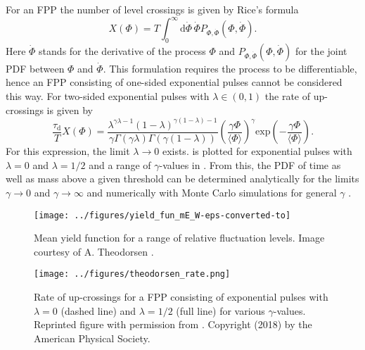 For an FPP the number of level crossings is given by Rice's formula \cite{rice1945mathematical}
\begin{equation}
	X(\Phi) = T\int_{0}^{\infty} \mathrm{d}\dot{\Phi}\, \dot{\Phi}P_{\Phi,\dot{\Phi}}\left(\Phi,\dot{\Phi}\right).
\end{equation}
Here $\dot{\Phi}$ stands for the derivative of the process $\Phi$ and $P_{\Phi,\dot{\Phi}}\left(\Phi,\dot{\Phi}\right)$ for the joint PDF between $\Phi$ and $\dot{\Phi}$. This formulation requires the process to be differentiable, hence an FPP consisting of one-sided exponential pulses cannot be considered this way. For two-sided exponential pulses with $\lambda \in (0,1)$ the rate of up-crossings is given by \cite{theodorsen2018level}
\begin{equation}\label{rate}
	\frac{\tau_\mathrm{d}}{T}X(\Phi) = \frac{\lambda^{\gamma\lambda-1}(1-\lambda)^{\gamma(1-\lambda)-1}}{\gamma\Gamma(\gamma\lambda)\Gamma(\gamma(1-\lambda))}\left(\frac{\gamma\Phi}{\langle\Phi\rangle}\right)^\gamma\mathrm{exp}\left(-\frac{\gamma\Phi}{\langle\Phi\rangle}\right).
\end{equation}
For this expression, the limit $\lambda\rightarrow0$ exists.  is plotted for exponential pulses with $\lambda=0$ and $\lambda=1/2$ and a range of $\gamma$-values in . From this, the PDF of time as well as mass above a given threshold can be determined analytically for the limits $\gamma\rightarrow 0$ and $\gamma\rightarrow \infty$  and numerically with Monte Carlo simulations for general $\gamma$ \cite{theodorsen2018level}. 
\begin{figure}
	\centering
	\begin{minipage}{.48\linewidth}
		\texttt{[image: ../figures/yield\_fun\_mE\_W-eps-converted-to]}
		\caption{Mean yield  function for a range of relative fluctuation levels. Image courtesy of A. Theodorsen \cite{theodorsen2018statistical}.}
		\label{Fig:theodorsen_yield}
	\end{minipage}
	\hfill
	\begin{minipage}{.48\linewidth}
		\texttt{[image: ../figures/theodorsen\_rate.png]}
		\caption{Rate of up-crossings for a FPP consisting of exponential pulses with $\lambda=0$ (dashed line) and $\lambda=1/2$ (full line) for various $\gamma$-values. Reprinted figure with permission from \cite{theodorsen2018level}. Copyright (2018) by the American Physical Society.}
		\label{Fig:theodorsen_avtime}
	\end{minipage}
\end{figure}

